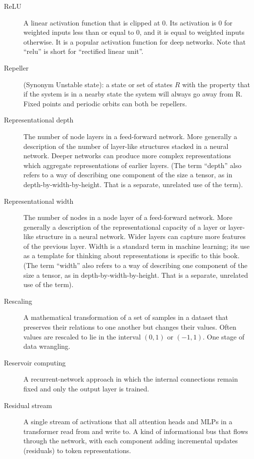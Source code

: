 \begin{description}
\item[ReLU] A linear activation function that is clipped at  0. Its activation is 0 for weighted inputs less than or equal to 0, and it is equal to weighted inputs otherwise. It is a popular activation function for deep networks. Note that ``relu'' is short for ``rectified linear unit''.

\item[Repeller] (Synonym Unstable state): a state or set of states $R$ with the property that if the system is in a nearby state the system will always go away from R. Fixed points and periodic orbits can both be repellers.

\item[Representational depth] The number of node layers in a feed-forward network. More generally a description of the number of  layer-like structures stacked in a neural network. Deeper networks can produce more complex representations which aggregate representations of earlier layers. (The term ``depth'' also refers to a way of describing one component of the size a tensor, as in depth-by-width-by-height. That is a separate, unrelated use of the term).

\item[Representational width] The number of nodes in a node layer of a feed-forward network. More generally a description of the representational capacity of a layer or layer-like structure in a neural network. Wider layers can capture more features of the previous layer. Width is a standard term in machine learning; its use as a template for thinking about representations is specific to this book. (The term ``width'' also refers to a way of describing one component of the size a tensor, as in depth-by-width-by-height. That is a separate, unrelated use of the term).

\item[Rescaling] A mathematical transformation of a set of samples in a dataset that preserves their relations to one another but changes their values. Often values are rescaled to lie in the interval $(0,1)$ or $(-1,1)$. One stage of data wrangling.

\item[Reservoir computing] A recurrent-network approach in which the internal connections remain fixed and only the output layer is trained.

\item[Residual stream] A single stream of activations that all attention heads and MLPs in a transformer read from and write to. A kind of informational bus that flows through the network, with each component adding incremental updates (residuals) to token representations.


\end{description}
